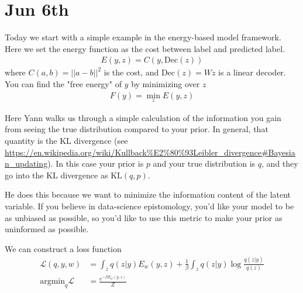 \section{Jun 6th}
Today we start with a simple example in the energy-based model framework. Here we set the energy function as the cost between label and predicted label.
\begin{align}
	E(y,z) = C(y, \text{Dec}(z))
\end{align}
where $C(a,b) = || a - b||^2$ is the cost, and $\text{Dec}(z) = Wz$ is a linear decoder. You can find the "free energy" of $y$ by minimizing over $z$
\begin{align}
	F(y)  = \min_z E(y,z)
\end{align}
\begin{sidework}
	Here Yann walks us through a simple calculation of the information you gain from seeing the true distribution compared to your prior. In general, that quantity is the KL divergence (see \url{https://en.wikipedia.org/wiki/Kullback\%E2\%80\%93Leibler\_divergence\#Bayesian_updating}). In this case your prior is $p$ and your true distribution is $q$, and they go into the KL divergence as $\text{KL}(q,p)$.
	
	He does this because we want to minimize the information content of the latent variable. If you believe in data-science epistomology, you'd like your model to be as unbiased as possible, so you'd like to use this metric to make your prior as uninformed as possible.
	
	We can construct a loss function
	\begin{align}
		\mathcal L(q,y,w) & = \int_z q(z|y) E_w(y,z) + \frac{1}{\beta} \int_z q(z|y) \log \frac{q(z|y)}{q(z)}\\
		\text{argmin}_q \mathcal L & = \frac{e^{-\beta E_w(y,z)}}{Z}
	\end{align}
\end{sidework}

